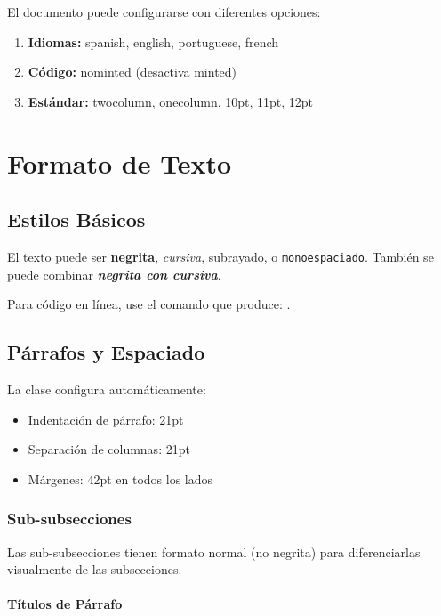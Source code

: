 \documentclass{pt-article}
\begin{document}
El documento puede configurarse con diferentes opciones:

\begin{enumerate}
    \item \textbf{Idiomas:} spanish, english, portuguese, french
    \item \textbf{Código:} nominted (desactiva minted)
    \item \textbf{Estándar:} twocolumn, onecolumn, 10pt, 11pt, 12pt
\end{enumerate}

\section{Formato de Texto}

\subsection{Estilos Básicos}

El texto puede ser \textbf{negrita}, \textit{cursiva}, \underline{subrayado},
o \texttt{monoespaciado}. También se puede combinar \textbf{\textit{negrita
con cursiva}}.

Para código en línea, use el comando 
que produce: .

\subsection{Párrafos y Espaciado}

La clase configura automáticamente:
\begin{itemize}
    \item Indentación de párrafo: 21pt
    \item Separación de columnas: 21pt
    \item Márgenes: 42pt en todos los lados
\end{itemize}

\subsubsection{Sub-subsecciones}

Las sub-subsecciones tienen formato normal (no negrita) para diferenciarlas
visualmente de las subsecciones.

\paragraph{Títulos de Párrafo}
\end{document}
